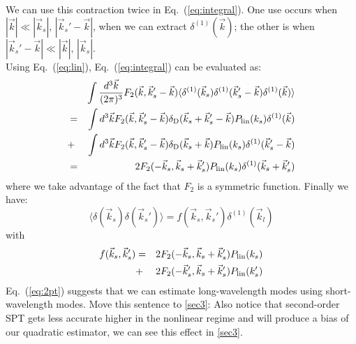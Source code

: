 \documentclass[prd,amsmath,amssymb,floatfix,superscriptaddress,nofootinbib,twocolumn]{revtex4-1}
\def\be{\begin{equation}}
\def\ee{\end{equation}}
\def\bea{\begin{eqnarray}}
\def\eea{\end{eqnarray}}
\newcommand{\vs}{\nonumber\\}
\newcommand{\vk}{\vec{k}}
\newcommand{\ec}[1]{Eq.~(\ref{eq:#1})}
\newcommand{\eql}[1]{\label{eq:#1}}
\newcommand{\RC}[1]{{\color{darkorange} #1}}
\begin{document}
We can use this contraction twice in \ec{integral}. One use occurs when $|\vk| \ll |\vk_s|,\, |\vk_s'-\vk|$, when we can extract ${\delta}^{(1)}(\vk)$; the other is when $|\vk_s'-\vk| \ll |\vk|,\,|\vk_s|$.\\
Using \ec{lin}, \ec{integral} can be evaluated as:
\bea 
&&\int \frac{d^3\vec{k}}{(2\pi)^3} F_2 (\vec{k},\vec{k}_s'-\vec{k})\langle {\delta}^{(1)}(\vec{k}_s){\delta}^{(1)}(\vec{k}_s'-\vec{k}){\delta}^{(1)}(\vec{k}) \rangle \vs
&=&\int d^3\vk F_2(\vec{k},\vec{k}_s'-\vec{k}) \delta_{\rm D}(\vk_s+\vk_s'-\vk)P_{\rm 
lin}(k_s){\delta}^{(1)}(\vec{k}) \vs
&+&\int d^3\vk F_2(\vec{k},\vec{k}_s'-\vec{k}) \delta_{\rm D}(\vk_s+\vk)P_{\rm 
lin}(k_s){\delta}^{(1)}(\vk_s'-\vk) \vs
&=&2F_2(-\vk_s,\vk_s+\vk_s')P_{\rm lin}(k_s){\delta}^{(1)}(\vk_s+\vk_s')
\eea 
where we take advantage of the fact that $F_2$ is a symmetric function.
Finally we have:
\be 
\langle {\delta}(\vec{k}_s){\delta}(\vec{k}_s') \rangle =f(\vec{k}_s,\vec{k}_s'){\delta}^{(1)}(\vec{k}_l) \eql{2pt}
\ee 
with
\bea
f(\vec{k}_s,\vec{k}_s')&=&2F_2(-\vec{k}_s,\vec{k}_s+\vec{k}_s')P_{\rm lin}(k_s)\vs
&+&2F_2(-\vec{k}_s',\vec{k}_s+\vec{k}_s')P_{\rm lin}(k_s')       
\eea 
\ec{2pt} suggests that we can estimate long-wavelength modes using short-wavelength modes.
\RC{Move this sentence to \ref{sec3}: Also notice that second-order SPT gets less accurate higher in the nonlinear regime and will produce a bias of our quadratic estimator, we can see this effect in \ref{sec3}.}
\end{document}
